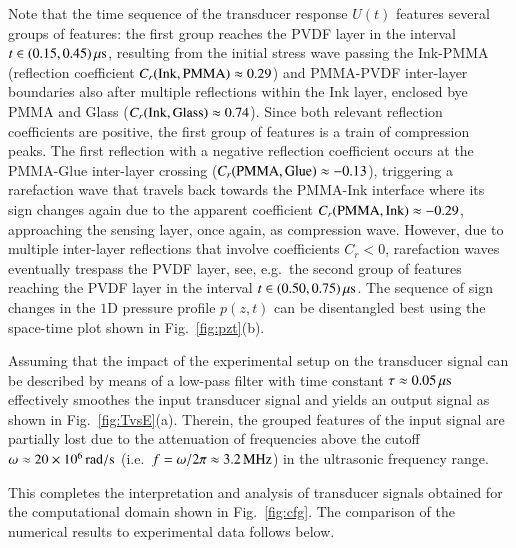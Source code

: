 \documentclass[5p,times,twocolumn]{elsarticle}
\begin{document}
Note that the time sequence of the transducer response $U(t)$ features several
groups of features: the first group reaches the PVDF layer in the interval
$t\in (0.15,0.45)\,{\rm{\mu s}}$, resulting from the initial stress wave
passing the Ink-PMMA (reflection coefficient $C_r({\rm{Ink}},{\rm{PMMA}})
\approx 0.29$) and PMMA-PVDF inter-layer boundaries also after multiple
reflections within the Ink layer, enclosed bye PMMA and Glass
($C_r({\rm{Ink}},{\rm{Glass}}) \approx 0.74$). Since both relevant reflection
coefficients are positive, the first group of features is a train of
compression peaks. The first reflection with a negative reflection coefficient
occurs at the PMMA-Glue inter-layer crossing ($C_r({\rm{PMMA}},{\rm{Glue}})
\approx -0.13$), triggering a rarefaction wave that travels back towards the
PMMA-Ink interface where its sign changes again due to the apparent coefficient
$C_r({\rm{PMMA}},{\rm{Ink}}) \approx -0.29$, approaching the sensing layer,
once again, as compression wave. However, due to multiple inter-layer
reflections that involve coefficients $C_r<0$, rarefaction waves eventually
trespass the PVDF layer, see, e.g.\ the second group of features reaching the
PVDF layer in the interval $t\in (0.50,0.75)\,{\rm{\mu s}}$. The sequence of
sign changes in the $1$D pressure profile $p(z,t)$ can be disentangled best
using the space-time plot shown in Fig.\ \ref{fig:pzt}(b).

Assuming that the impact of the experimental setup on the transducer signal can
be described by means of a low-pass filter with time constant $\tau \approx
0.05\,{\rm{\mu s}}$ effectively smoothes the input transducer signal and yields
an output signal as shown in Fig.\ \ref{fig:TvsE}(a). Therein, the grouped
features of the input signal are partially lost due to the attenuation of
frequencies above the cutoff $\omega \approx 20 \times 10^6\,{\rm{rad/s}}$ (i.e.\ $f =
\omega/ 2 \pi\approx 3.2\,{\rm{MHz}}$) in the ultrasonic frequency range.

This completes the interpretation and analysis of transducer signals obtained
for the computational domain shown in Fig.\ \ref{fig:cfg}. The comparison of
the numerical results to experimental data follows below.
\end{document}
